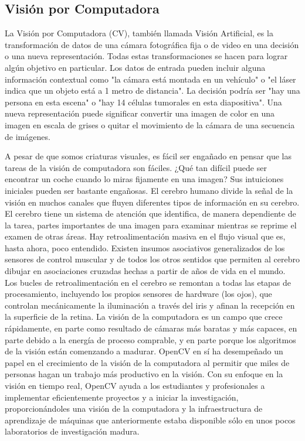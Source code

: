 \subsection*{Visión por Computadora}

La Visión por Computadora (CV), también llamada Visión Artificial, es la transformación de datos de una cámara fotográfica fija o de video en una decisión o una nueva representación. Todas estas transformaciones se hacen para lograr algún objetivo en particular. Los datos de entrada pueden incluir alguna información contextual como "la cámara está montada en un vehículo" o "el láser indica que un objeto está a 1 metro de distancia". La decisión podría ser "hay una persona en esta escena" o "hay 14 células tumorales en esta diapositiva". Una nueva representación puede significar convertir una imagen de color en una imagen en escala de grises o quitar el movimiento de la cámara de una secuencia de imágenes.\cite{Bradski2008}

A pesar de que somos criaturas visuales, es fácil ser engañado en pensar que las tareas de la visión de computadora son fáciles. ¿Qué tan difícil puede ser encontrar un coche cuando lo miras fijamente en una imagen? Sus intuiciones iniciales pueden ser bastante engañosas. El cerebro humano divide la señal de la visión en muchos canales que fluyen diferentes tipos de información en su cerebro. El cerebro tiene un sistema de atención que identifica, de manera dependiente de la tarea, partes importantes de una imagen para examinar mientras se reprime el examen de otras áreas. Hay retroalimentación masiva en el flujo visual que es, hasta ahora, poco entendido. Existen insumos asociativos generalizados de los sensores de control muscular y de todos los otros sentidos que permiten al cerebro dibujar en asociaciones cruzadas hechas a partir de años de vida en el mundo. Los bucles de retroalimentación en el cerebro se remontan a todas las etapas de procesamiento, incluyendo los propios sensores de hardware (los ojos), que controlan mecánicamente la iluminación a través del iris y afinan la recepción en la superficie de la retina. La visión de la computadora es un campo que crece rápidamente, en parte como resultado de cámaras más baratas y más capaces, en parte debido a la energía de proceso comprable, y en parte porque los algoritmos de la visión están comenzando a madurar. OpenCV en sí ha desempeñado un papel en el crecimiento de la visión de la computadora al permitir que miles de personas hagan un trabajo más productivo en la visión. Con su enfoque en la visión en tiempo real, OpenCV ayuda a los estudiantes y profesionales a implementar eficientemente proyectos y a iniciar la investigación, proporcionándoles una visión de la computadora y la infraestructura de aprendizaje de máquinas que anteriormente estaba disponible sólo en unos pocos laboratorios de investigación madura.\cite{Bradski2008}

